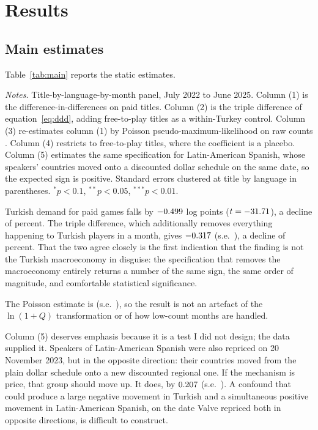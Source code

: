\documentclass[11pt]{article}
\newcommand{\notes}[1]{%
  \par\vspace{4pt}\noindent
  \begin{minipage}{\linewidth}\setstretch{1.02}\footnotesize
  \textit{Notes.} #1\end{minipage}}
\begin{document}
\section{Results}\label{sec:results}

\subsection{Main estimates}

Table~\ref{tab:main} reports the static estimates.

\begin{table}[htbp]
\centering
\caption{The end of Turkish Lira pricing and demand for paid games}\label{tab:main}
\vspace{2pt}
{\footnotesize}
\notes{Title-by-language-by-month panel, July 2022 to June 2025. Column (1) is the
difference-in-differences on paid titles. Column (2) is the triple difference of
equation~\eqref{eq:ddd}, adding free-to-play titles as a within-Turkey control. Column (3)
re-estimates column (1) by Poisson pseudo-maximum-likelihood on raw counts \citep{silva2006}.
Column (4) restricts to free-to-play titles, where the coefficient is a placebo. Column (5)
estimates the same specification for Latin-American Spanish, whose speakers' countries moved onto a
discounted dollar schedule on the same date, so the expected sign is positive. Standard errors
clustered at title by language in parentheses. $^{*}p<0.1$, $^{**}p<0.05$, $^{***}p<0.01$.}
\end{table}

Turkish demand for paid games falls by $-0.499$ log points ($t = -31.71$), a decline of \pctDiD{}
percent. The triple difference, which additionally removes everything happening to Turkish players
in a month, gives $-0.317$ (s.e.\ \seDDD), a decline of \pctDDD{} percent. That the two agree
closely is the first indication that the finding is not the Turkish macroeconomy in disguise: the
specification that removes the macroeconomy entirely returns a number of the same sign, the same
order of magnitude, and comfortable statistical significance.

The Poisson estimate is \bPPML{} (s.e.\ \sePPML), so the result is not an artefact of the
$\ln(1+Q)$ transformation or of how low-count months are handled.

Column (5) deserves emphasis because it is a test I did not design; the data supplied it. Speakers
of Latin-American Spanish were also repriced on 20 November 2023, but in the opposite direction:
their countries moved from the plain dollar schedule onto a new discounted regional one. If the
mechanism is price, that group should move up. It does, by $0.207$ (s.e.\ \seLatam). A confound
that could produce a large negative movement in Turkish and a simultaneous positive movement in
Latin-American Spanish, on the date Valve repriced both in opposite directions, is
difficult to construct.
\end{document}
